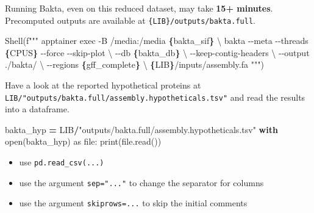 \documentclass[
]{book}
\newenvironment{Shaded}{\begin{snugshade}}{\end{snugshade}}
\newcommand{\BuiltInTok}[1]{#1}
\newcommand{\CharTok}[1]{\textcolor[rgb]{0.31,0.60,0.02}{#1}}
\newcommand{\ControlFlowTok}[1]{\textcolor[rgb]{0.13,0.29,0.53}{\textbf{#1}}}
\newcommand{\ImportTok}[1]{#1}
\newcommand{\NormalTok}[1]{#1}
\newcommand{\OperatorTok}[1]{\textcolor[rgb]{0.81,0.36,0.00}{\textbf{#1}}}
\newcommand{\SpecialCharTok}[1]{\textcolor[rgb]{0.81,0.36,0.00}{\textbf{#1}}}
\newcommand{\SpecialStringTok}[1]{\textcolor[rgb]{0.31,0.60,0.02}{#1}}
\newcommand{\StringTok}[1]{\textcolor[rgb]{0.31,0.60,0.02}{#1}}
\providecommand{\tightlist}{%
  \setlength{\itemsep}{0pt}\setlength{\parskip}{0pt}}
\begin{document}
Running Bakta, even on this reduced dataset, may take \textbf{15+ minutes}. Precomputed outputs are available at \texttt{\{LIB\}/outputs/bakta.full}.

\begin{Shaded}
\begin{Highlighting}[numbers=left,,]
\NormalTok{Shell(}\SpecialStringTok{f"""}
\SpecialStringTok{apptainer exec {-}B /media:/media }\SpecialCharTok{\{}\NormalTok{bakta\_sif}\SpecialCharTok{\}}\SpecialStringTok{ }\CharTok{\textbackslash{}}
\SpecialStringTok{    bakta {-}{-}meta {-}{-}threads }\SpecialCharTok{\{}\NormalTok{CPUS}\SpecialCharTok{\}}\SpecialStringTok{ {-}{-}force {-}{-}skip{-}plot }\CharTok{\textbackslash{}}
\SpecialStringTok{        {-}{-}db }\SpecialCharTok{\{}\NormalTok{bakta\_db}\SpecialCharTok{\}}\SpecialStringTok{ }\CharTok{\textbackslash{}}
\SpecialStringTok{        {-}{-}keep{-}contig{-}headers }\CharTok{\textbackslash{}}
\SpecialStringTok{        {-}{-}output ./bakta/ }\CharTok{\textbackslash{}}
\SpecialStringTok{        {-}{-}regions }\SpecialCharTok{\{}\NormalTok{gff\_complete}\SpecialCharTok{\}}\SpecialStringTok{ }\CharTok{\textbackslash{}}
\SpecialStringTok{        }\SpecialCharTok{\{}\NormalTok{LIB}\SpecialCharTok{\}}\SpecialStringTok{/inputs/assembly.fa}
\SpecialStringTok{"""}\NormalTok{)}
\end{Highlighting}
\end{Shaded}

Have a look at the reported hypothetical proteins at \texttt{LIB/"outputs/bakta.full/assembly.hypotheticals.tsv"} and read the results into a dataframe.

\begin{Shaded}
\begin{Highlighting}[numbers=left,,]
\NormalTok{bakta\_hyp }\OperatorTok{=}\NormalTok{ LIB}\OperatorTok{/}\StringTok{"outputs/bakta.full/assembly.hypotheticals.tsv"}
\ControlFlowTok{with} \BuiltInTok{open}\NormalTok{(bakta\_hyp) }\ImportTok{as} \BuiltInTok{file}\NormalTok{:}
    \BuiltInTok{print}\NormalTok{(}\BuiltInTok{file}\NormalTok{.read())}
\end{Highlighting}
\end{Shaded}

\begin{itemize}
\tightlist
\item
  use \texttt{pd.read\_csv(...)}
\item
  use the argument \texttt{sep="..."} to change the separator for columns
\item
  use the argument \texttt{skiprows=...} to skip the initial comments
\end{itemize}
\end{document}
